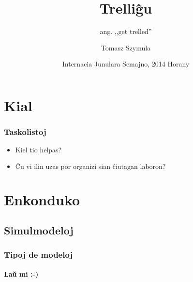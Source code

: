 \documentclass{beamer}
\title{Trelliĝu}
\subtitle{ang. ,,get trelled''}
\author{Tomasz Szymula}
\institute[PEJ]{Pola Esperanto-Junularo}
\date[IJS 2014]{Internacia Junulara Semajno, 2014 Horany}
\begin{document}
  \frame{\titlepage}



  
  \section{Kial}
  
  \begin{frame}
    \frametitle{Taskolistoj}
    
    \begin{itemize}
    	\item Kiel tio helpas?
    	\item Ĉu vi ilin uzas por organizi sian ĉiutagan laboron?
    \end{itemize}
  \end{frame}    
  
  \section{Enkonduko}
  \subsection{Simulmodeloj}
  
  
  \begin{frame}
    \frametitle{Tipoj de modeloj}
    \framesubtitle{Laŭ mi :-)}
  
  \end{frame}
  
\end{document}
